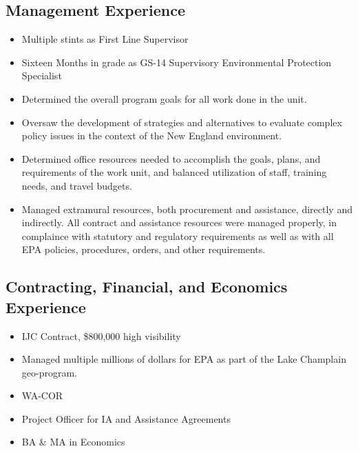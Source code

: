 \documentclass[12pt]{article}
\begin{document}
\subsection{Management Experience}
\begin{itemize}
\item
  Multiple stints as First Line Supervisor
\item
  Sixteen Months in grade as GS-14 Supervisory Environmental Protection Specialist
\item Determined the overall program goals for all work done in the unit.
\item Oversaw the development of strategies and alternatives to evaluate complex policy issues in the context of the New England environment.
\item Determined office resources needed to accomplish the goals, plans, and requirements of the work unit, and balanced utilization of staff, training needs, and travel budgets.
\item
  Managed extramural resources, both procurement and assistance,
  directly and indirectly.  All contract and assistance resources were
  managed properly, in complaince with statutory and regulatory
  requirements as well as with all EPA policies, procedures, orders,
  and other requirements.

\end{itemize}

\subsection{Contracting, Financial, and Economics Experience}
\begin{itemize}
\item IJC Contract, \$800,000 high visibility
\item Managed multiple millions of dollars for EPA as part of the Lake Champlain geo-program.
\item WA-COR
\item Project Officer for IA and Assistance Agreements
\item BA \& MA in Economics
  
\end{itemize}
\end{document}
